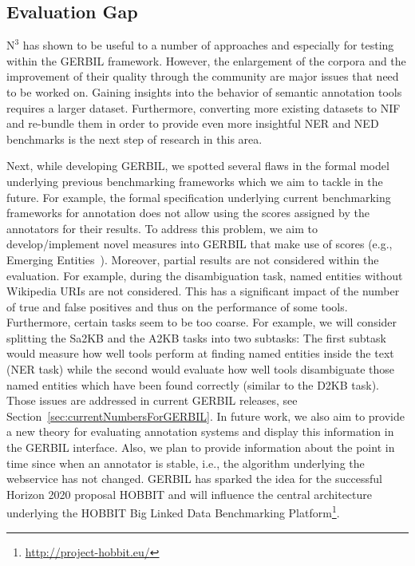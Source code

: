 \subsection*{Evaluation Gap}

$\mbox{N}^3$ has shown to be useful to a number of approaches and especially for testing within the GERBIL framework. 
However, the enlargement of the corpora and the improvement of their quality through the community are major issues that need to be worked on. 
Gaining insights into the behavior of semantic annotation tools requires a larger dataset.
Furthermore, converting more existing datasets to NIF and re-bundle them in order to provide even more insightful NER and NED benchmarks is the next step of research in this area.


Next, while developing GERBIL, we spotted several flaws in the formal model underlying previous benchmarking frameworks which we aim to tackle in the future. 
For example, the formal specification underlying current benchmarking frameworks for annotation does not allow using the scores assigned by the annotators for their results. 
To address this problem, we aim to develop/implement novel measures into GERBIL that make use of scores (e.g., Emerging Entities~\cite{Hoffart:2014:DEE:2566486.2568003}).
Moreover, partial results are not considered within the evaluation. 
For example, during the disambiguation task, named entities without Wikipedia URIs are not considered. 
This has a significant impact of the number of true and false positives and thus on the performance of some tools.
Furthermore, certain tasks seem to be too coarse. 
For example, we will consider splitting the Sa2KB and the A2KB tasks into two subtasks: The first subtask would measure how well tools perform at finding named entities inside the text (\ac{NER} task) while the second would evaluate how well tools disambiguate those named entities which have been found correctly (similar to the D2KB task).
Those issues are addressed in current GERBIL releases, see Section~\ref{sec:currentNumbersForGERBIL}. 
In future work, we also aim to provide a new theory for evaluating annotation systems and display this information in the GERBIL interface.
Also, we plan to provide information about the point in time since when an annotator is stable, i.e., the algorithm underlying the webservice has not changed.
GERBIL has sparked the idea for the successful Horizon 2020 proposal HOBBIT and will influence the central architecture underlying the HOBBIT Big Linked Data Benchmarking Platform\footnote{\url{http://project-hobbit.eu/}}. 


